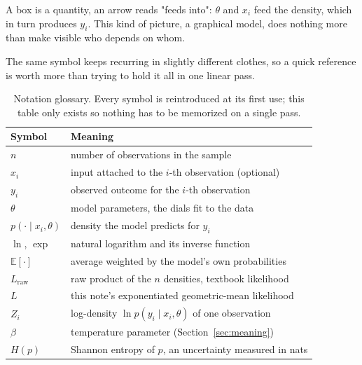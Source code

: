\documentclass[11pt]{article}
\begin{document}
\begin{center}
\end{center}
\begin{center}
\footnotesize
A box is a quantity, an arrow reads "feeds into": $\theta$ and $x_i$
feed the density, which in turn produces $y_i$. This kind of picture,
a graphical model, does nothing more than make visible who depends on
whom.
\end{center}

The same symbol keeps recurring in slightly different clothes, so a
quick reference is worth more than trying to hold it all in one linear
pass.

\begin{table}[H]
\centering
\small
\begin{tabular}{@{}ll@{}}
\toprule
Symbol & Meaning \\
\midrule
$n$ & number of observations in the sample \\
$x_i$ & input attached to the $i$-th observation (optional) \\
$y_i$ & observed outcome for the $i$-th observation \\
$\theta$ & model parameters, the dials fit to the data \\
$p(\cdot \mid x_i,\theta)$ & density the model predicts for $y_i$ \\
$\ln$, $\exp$ & natural logarithm and its inverse function \\
$\mathbb E[\cdot]$ & average weighted by the model's own probabilities \\
$L_{\text{raw}}$ & raw product of the $n$ densities, textbook likelihood \\
$L$ & this note's exponentiated geometric-mean likelihood \\
$Z_i$ & log-density $\ln p(y_i \mid x_i,\theta)$ of one observation \\
$\beta$ & temperature parameter (Section~\ref{sec:meaning}) \\
$H(p)$ & Shannon entropy of $p$, an uncertainty measured in nats \\
\bottomrule
\end{tabular}
\caption{Notation glossary. Every symbol is reintroduced at its first
use; this table only exists so nothing has to be memorized on a single
pass.}
\label{tab:notation}
\end{table}
\end{document}

